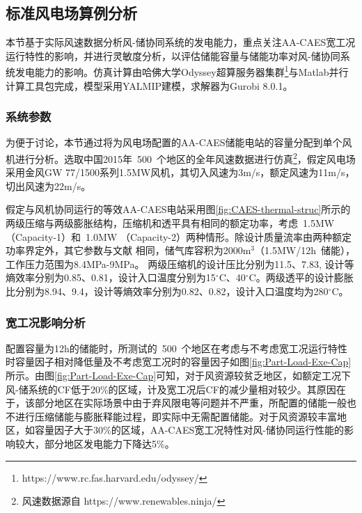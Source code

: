 \subsection{标准风电场算例分析}

本节基于实际风速数据分析风-储协同系统的发电能力，重点关注AA-CAES宽工况运行特性的影响，并进行灵敏度分析，以评估储能容量与储能功率对风-储协同系统发电能力的影响\cite{CAES-Wind-Rui-19}。仿真计算由哈佛大学Odyssey超算服务器集群\footnote{https://www.rc.fas.harvard.edu/odyssey/}与Matlab并行计算工具包完成，模型采用YALMIP\cite{YALMIP}建模，求解器为Gurobi 8.0.1。

\subsubsection{系统参数}
为便于讨论，本节通过将为风电场配置的AA-CAES储能电站的容量分配到单个风机进行分析。选取中国2015年~500~个地区的全年风速数据进行仿真\footnote{风速数据源自 https://www.renewables.ninja/}，假定风电场采用金风GW 77/1500系列1.5MW风机，其切入风速为3m/s，额定风速为11m/s， 切出风速为22m/s。

假定与风机协同运行的等效AA-CAES电站采用图\ref{fig:CAES-thermal-struc}所示的两级压缩与两级膨胀结构，压缩机和透平具有相同的额定功率，考虑~1.5MW（Capacity-1）和~1.0MW （Capacity-2）两种情形\cite{CAES-Wind-Rui-19}。除设计质量流率由两种额定功率界定外，其它参数与文献 相同，储气库容积为2000m$^3$（1.5MW/12h~储能），工作压力范围为8.4MPa-9MPa。 两级压缩机的设计压比分别为11.5、7.83, 设计等熵效率分别为0.85、0.81，设计入口温度分别为15$^\circ$C、40$^\circ$C。两级透平的设计膨胀比分别为8.94、9.4，设计等熵效率分别为0.82、0.82，设计入口温度均为280$^\circ$C。


\subsubsection{宽工况影响分析}
配置容量为12h的储能时，所测试的~500~个地区在考虑与不考虑宽工况运行特性时容量因子相对降低量及不考虑宽工况时的容量因子如图\ref{fig:Part-Load-Exe-Cap}所示。由图\ref{fig:Part-Load-Exe-Cap}可知，对于风资源较贫乏地区，如额定工况下风-储系统的CF低于20\%的区域，计及宽工况后CF的减少量相对较少。其原因在于，该部分地区在实际场景中由于弃风限电等问题并不严重，所配置的储能一般也不进行压缩储能与膨胀释能过程，即实际中无需配置储能。对于风资源较丰富地区，如容量因子大于30\%的区域，AA-CAES宽工况特性对风-储协同运行性能的影响较大，部分地区发电能力下降达5\%\cite{CAES-Wind-Rui-19}。

